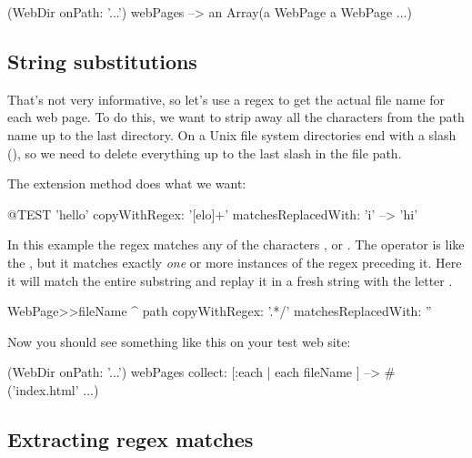\documentclass[a4paper,10pt,twoside]{book}
\begin{document}
\begin{code}{}
(WebDir onPath: '...') webPages --> an Array(a WebPage a WebPage ...)
\end{code}

\subsection{String substitutions}

That's not very informative, so let's use a regex to get the actual file name for each web page.
To do this, we want to strip away all the characters from the path name up to the last directory.
On a Unix file system directories end with a slash (\ct{/}), so we need to delete everything up to the last slash in the file path.

The  extension method  does what we want:

\begin{code}{@TEST}
'hello' copyWithRegex: '[elo]+' matchesReplacedWith: 'i' --> 'hi'
\end{code}

In this example the regex \ct{[elo]} matches any of the characters ,  or .
The operator \ct{+} is like the , but it matches exactly \emph{one} or more instances of the regex preceding it. Here it will match the entire substring  and replay it in a fresh string with the letter .


\begin{code}{}
WebPage>>fileName
	^ path copyWithRegex: '.*/' matchesReplacedWith: ''
\end{code}

Now you should see something like this on your test web site:

\begin{code}{}
(WebDir onPath: '...') webPages collect: [:each | each fileName ]
  --> #('index.html' ...)
\end{code}

\subsection{Extracting regex matches}
\end{document}
